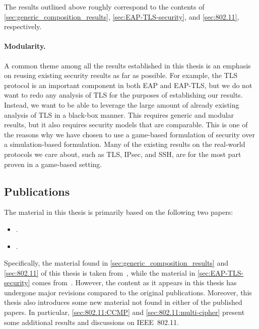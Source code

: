 The results outlined above roughly correspond to the contents of \cref{sec:generic_composition_results},
\cref{sec:EAP-TLS-security},
and \cref{sec:802.11},
respectively.





\paragraph{Modularity.}
A common theme among all the results established in this thesis is an emphasis on reusing  existing security results as far as possible.
For example,
the TLS protocol is an important component in both EAP and EAP-TLS,
but we do not want to redo any analysis of TLS for the purposes of establishing our results.
Instead,
we want to be able to leverage the large amount of already existing analysis of TLS in a black-box manner.
This requires generic and modular results,
but it also requires security models that are comparable.
This is one of the reasons why we have chosen to use a game-based formulation of security over a simulation-based formulation.
Many of the existing results on the real-world protocols we care about,
such as TLS, IPsec, and SSH, 
are for the most part proven in a game-based setting.
%


\subsection{Publications}

The material in this thesis is primarily based on the following two papers:
\begin{itemize}[leftmargin=*,labelindent=2.5em]
	\item[\cite{PKC:BrzJac17}] . 
	
	\item[\cite{EC:BrzJacSte16}] . 
\end{itemize}

Specifically,
the material found in \cref{sec:generic_composition_results} and \cref{sec:802.11} of this thesis is taken from~\cite{PKC:BrzJac17},
while the material in \cref{sec:EAP-TLS-security} comes from~\cite{EC:BrzJacSte16}.
However,
the content as it appears in this thesis has undergone major revisions compared to the original publications.
Moreover,
this thesis also introduces some new material not found in either of the published papers.
In particular,
\cref{sec:802.11:CCMP} and \cref{sec:802.11:multi-cipher} present some additional results and discussions on IEEE~802.11.




